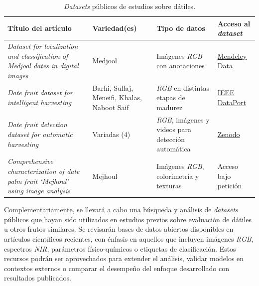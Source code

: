 \begin{table}[h]
\centering
\begin{tabular}{|p{5cm}|p{2.5cm}|p{3cm}|p{4cm}|}
\hline
\textbf{Título del artículo} & \textbf{Variedad(es)} & \textbf{Tipo de datos} & \textbf{Acceso al \textit{dataset}} \\
\hline

\textit{Dataset for localization and classification of Medjool dates in digital images} \newline \parencite{perez-perez_dataset_2021} & Medjool & Imágenes \textit{RGB} con anotaciones & \href{https://data.mendeley.com/datasets/872xk9npmz/1}{Mendeley Data} \\

\hline

\textit{Date fruit dataset for intelligent harvesting} \newline \parencite{altaheri_date_2019} & Barhi, Sullaj, Meneifi, Khalas, Naboot Saif & \textit{RGB} en distintas etapas de madurez & \href{https://ieee-dataport.org/open-access/date-fruit-dataset-automated-harvesting-and-visual-yield-estimation}{IEEE DataPort} \\

\hline

\textit{Date fruit detection dataset for automatic harvesting} \newline \parencite{zarouit_date_2024} & Variadas (4) & \textit{RGB}, imágenes y videos para detección automática & \href{https://zenodo.org/records/10143465}{Zenodo} \\

\hline

\textit{Comprehensive characterization of date palm fruit ‘Mejhoul’ using image analysis} \newline \parencite{noutfia_comprehensive_2022} & Mejhoul & Imágenes \textit{RGB}, colorimetría y texturas & Acceso bajo petición \\

\hline

\end{tabular}
\caption{\textit{Datasets} públicos de estudios sobre dátiles.}
\label{tab:datasets}
\end{table}

Complementariamente, se llevará a cabo una búsqueda y análisis de \textit{datasets} públicos que hayan sido utilizados en estudios previos sobre evaluación de dátiles u otros frutos similares. Se revisarán bases de datos abiertos disponibles en artículos científicos recientes, con énfasis en aquellos que incluyen imágenes \textit{RGB}, espectros \textit{NIR}, parámetros físico-químicos o etiquetas de clasificación. Estos recursos podrán ser aprovechados para extender el análisis, validar modelos en contextos externos o comparar el desempeño del enfoque desarrollado con resultados publicados.\\

